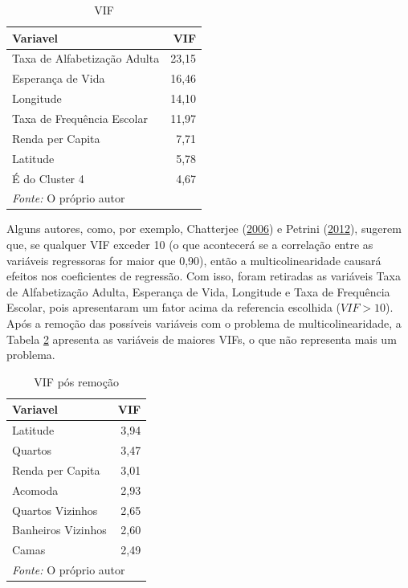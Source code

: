 \documentclass[
	12pt,				%
	a4paper,		%
	oneside,    %
	chapter=TITLE,		   %
	section=TITLE,		   %
	subsection=TITLE,	   %
	subsubsection=TITLE, %
	english,			%
	french,				%
	spanish,			%
	brazil,				%
]{abntex2}
\begin{document}
\begin{table}

\caption{\label{tab:vif}VIF}
\centering
\begin{tabular}[t]{l|r}
\hline
Variavel & VIF\\
\hline
Taxa de Alfabetização Adulta & 23,15\\
\hline
Esperança de Vida & 16,46\\
\hline
Longitude & 14,10\\
\hline
Taxa de Frequência Escolar & 11,97\\
\hline
Renda per Capita & 7,71\\
\hline
Latitude & 5,78\\
\hline
É do Cluster 4 & 4,67\\
\hline
\multicolumn{2}{l}{\textit{Fonte: } O próprio autor}\\
\end{tabular}
\end{table}

Alguns autores, como, por exemplo, Chatterjee
(\protect\hyperlink{ref-chatterjee2006analysis}{2006}) e Petrini
(\protect\hyperlink{ref-petrini2012degree}{2012}), sugerem que, se
qualquer VIF exceder 10 (o que acontecerá se a correlação entre as
variáveis regressoras for maior que 0,90), então a multicolinearidade
causará efeitos nos coeficientes de regressão. Com isso, foram retiradas
as variáveis Taxa de Alfabetização Adulta, Esperança de Vida, Longitude
e Taxa de Frequência Escolar, pois apresentaram um fator acima da
referencia escolhida (\(VIF>10\)). Após a remoção das possíveis
variáveis com o problema de multicolinearidade, a Tabela
\ref{tab:vif_final} apresenta as variáveis de maiores VIFs, o que não
representa mais um problema.

\begin{table}

\caption{\label{tab:vif_final}VIF pós remoção}
\centering
\begin{tabular}[t]{l|r}
\hline
Variavel & VIF\\
\hline
Latitude & 3,94\\
\hline
Quartos & 3,47\\
\hline
Renda per Capita & 3,01\\
\hline
Acomoda & 2,93\\
\hline
Quartos Vizinhos & 2,65\\
\hline
Banheiros Vizinhos & 2,60\\
\hline
Camas & 2,49\\
\hline
\multicolumn{2}{l}{\textit{Fonte: } O próprio autor}\\
\end{tabular}
\end{table}
\end{document}
